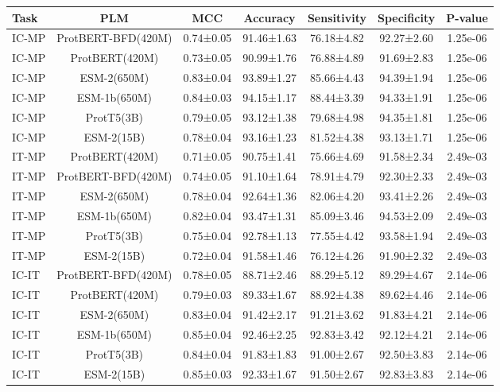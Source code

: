 \begin{tabular}{lcccccc}
\toprule
 Task &                PLM &       MCC &   Accuracy & Sensitivity & Specificity &  P-value \\
\midrule
IC-MP & ProtBERT-BFD(420M) & 0.74±0.05 & 91.46±1.63 &  76.18±4.82 &  92.27±2.60 & 1.25e-06 \\
IC-MP &     ProtBERT(420M) & 0.73±0.05 & 90.99±1.76 &  76.88±4.89 &  91.69±2.83 & 1.25e-06 \\
IC-MP &        ESM-2(650M) & 0.83±0.04 & 93.89±1.27 &  85.66±4.43 &  94.39±1.94 & 1.25e-06 \\
IC-MP &       ESM-1b(650M) & 0.84±0.03 & 94.15±1.17 &  88.44±3.39 &  94.33±1.91 & 1.25e-06 \\
IC-MP &         ProtT5(3B) & 0.79±0.05 & 93.12±1.38 &  79.68±4.98 &  94.35±1.81 & 1.25e-06 \\
IC-MP &         ESM-2(15B) & 0.78±0.04 & 93.16±1.23 &  81.52±4.38 &  93.13±1.71 & 1.25e-06 \\
IT-MP &     ProtBERT(420M) & 0.71±0.05 & 90.75±1.41 &  75.66±4.69 &  91.58±2.34 & 2.49e-03 \\
IT-MP & ProtBERT-BFD(420M) & 0.74±0.05 & 91.10±1.64 &  78.91±4.79 &  92.30±2.33 & 2.49e-03 \\
IT-MP &        ESM-2(650M) & 0.78±0.04 & 92.64±1.36 &  82.06±4.20 &  93.41±2.26 & 2.49e-03 \\
IT-MP &       ESM-1b(650M) & 0.82±0.04 & 93.47±1.31 &  85.09±3.46 &  94.53±2.09 & 2.49e-03 \\
IT-MP &         ProtT5(3B) & 0.75±0.04 & 92.78±1.13 &  77.55±4.42 &  93.58±1.94 & 2.49e-03 \\
IT-MP &         ESM-2(15B) & 0.72±0.04 & 91.58±1.46 &  76.12±4.26 &  91.90±2.32 & 2.49e-03 \\
IC-IT & ProtBERT-BFD(420M) & 0.78±0.05 & 88.71±2.46 &  88.29±5.12 &  89.29±4.67 & 2.14e-06 \\
IC-IT &     ProtBERT(420M) & 0.79±0.03 & 89.33±1.67 &  88.92±4.38 &  89.62±4.46 & 2.14e-06 \\
IC-IT &        ESM-2(650M) & 0.83±0.04 & 91.42±2.17 &  91.21±3.62 &  91.83±4.21 & 2.14e-06 \\
IC-IT &       ESM-1b(650M) & 0.85±0.04 & 92.46±2.25 &  92.83±3.42 &  92.12±4.21 & 2.14e-06 \\
IC-IT &         ProtT5(3B) & 0.84±0.04 & 91.83±1.83 &  91.00±2.67 &  92.50±3.83 & 2.14e-06 \\
IC-IT &         ESM-2(15B) & 0.85±0.03 & 92.33±1.67 &  91.50±2.67 &  92.83±3.83 & 2.14e-06 \\
\bottomrule
\end{tabular}
